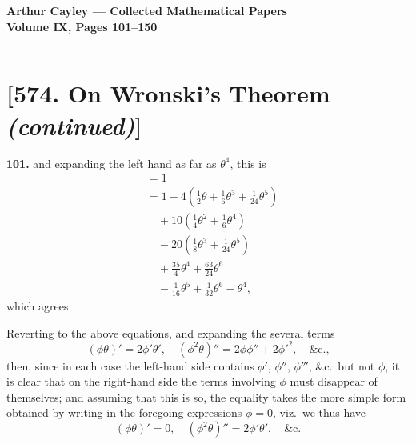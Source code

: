 \documentclass[11pt,a4paper]{article}
\theoremstyle{plain}
\begin{document}
\begin{center}
\Large\bfseries Arthur Cayley --- Collected Mathematical Papers\\[4pt]
\large Volume IX, Pages 101--150
\end{center}

\vspace{1em}
\hrule
\vspace{1.5em}

\section*{[574. On Wronski's Theorem \textit{(continued)}]}

\noindent\textbf{101.} and expanding the left hand as far as $\theta^4$, this is
\begin{align*}
&= 1 \\
&= 1 - 4(\tfrac{1}{2}\theta + \tfrac{1}{6}\theta^3 + \tfrac{1}{24}\theta^5) \\
&\quad {}+ 10(\tfrac{1}{4}\theta^2 + \tfrac{1}{6}\theta^4) \\
&\quad {}- 20(\tfrac{1}{8}\theta^3 + \tfrac{1}{24}\theta^5) \\
&\quad {}+ \tfrac{35}{4}\theta^4 + \tfrac{63}{24}\theta^6 \\
&\quad {}- \tfrac{1}{16}\theta^5 + \tfrac{1}{32}\theta^6 - \theta^4,
\end{align*}
which agrees.

Reverting to the above equations, and expanding the several terms
\[
(\phi\theta)' = 2\phi'\theta', \quad
(\phi^2\theta)'' = 2\phi\phi'' + 2\phi'^2, \quad \text{\&c.,}
\]
then, since in each case the left-hand side contains $\phi'$, $\phi''$, $\phi'''$, \&c.\ but not $\phi$, it is clear that on the right-hand side the terms involving $\phi$ must disappear of themselves; and assuming that this is so, the equality takes the more simple form obtained by writing in the foregoing expressions $\phi = 0$, viz.\ we thus have
\[
(\phi\theta)' = 0, \quad (\phi^2\theta)'' = 2\phi'\theta', \quad \text{\&c.}
\]
\end{document}
